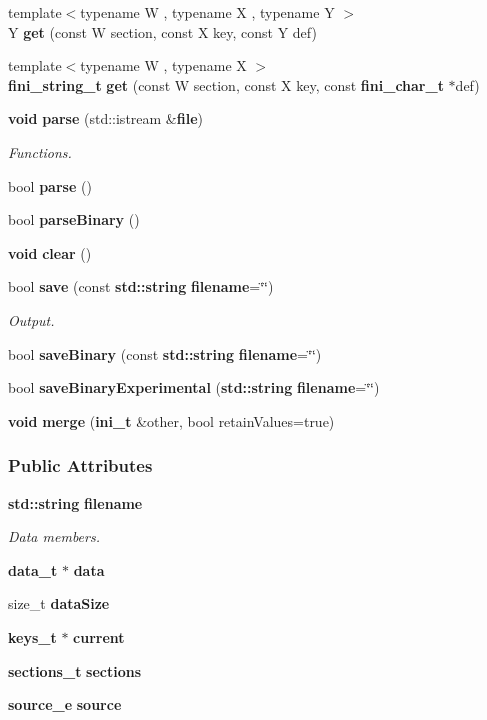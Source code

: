 \begin{DoxyCompactItemize}
\item 
{\footnotesize template$<$typename W , typename X , typename Y $>$ }\\Y {\bf get} (const W section, const X key, const Y def)
\item 
{\footnotesize template$<$typename W , typename X $>$ }\\{\bf fini\+\_\+string\+\_\+t} {\bf get} (const W section, const X key, const {\bf fini\+\_\+char\+\_\+t} $\ast$def)
\item 
{\bf void} {\bf parse} (std\+::istream \&{\bf file})
\begin{DoxyCompactList}\small\item\em Functions. \end{DoxyCompactList}\item 
bool {\bf parse} ()
\item 
bool {\bf parse\+Binary} ()
\item 
{\bf void} {\bf clear} ()
\item 
bool {\bf save} (const {\bf std\+::string} {\bf filename}=\char`\"{}\char`\"{})
\begin{DoxyCompactList}\small\item\em Output. \end{DoxyCompactList}\item 
bool {\bf save\+Binary} (const {\bf std\+::string} {\bf filename}=\char`\"{}\char`\"{})
\item 
bool {\bf save\+Binary\+Experimental} ({\bf std\+::string} {\bf filename}=\char`\"{}\char`\"{})
\item 
{\bf void} {\bf merge} ({\bf ini\+\_\+t} \&other, bool retain\+Values=true)
\end{DoxyCompactItemize}
\subsubsection*{Public Attributes}
\begin{DoxyCompactItemize}
\item 
{\bf std\+::string} {\bf filename}
\begin{DoxyCompactList}\small\item\em Data members. \end{DoxyCompactList}\item 
{\bf data\+\_\+t} $\ast$ {\bf data}
\item 
size\+\_\+t {\bf data\+Size}
\item 
{\bf keys\+\_\+t} $\ast$ {\bf current}
\item 
{\bf sections\+\_\+t} {\bf sections}
\item 
{\bf source\+\_\+e} {\bf source}
\end{DoxyCompactItemize}
